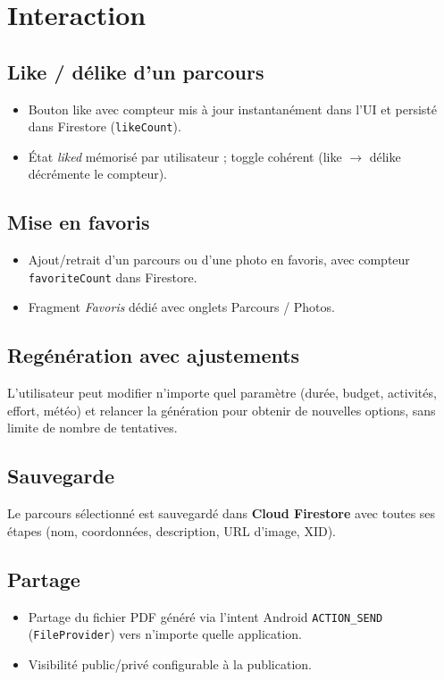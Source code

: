\documentclass[a4paper,11pt]{article}
\begin{document}
\section{Interaction}

\subsection{Like / délike d'un parcours}
\begin{itemize}[leftmargin=1.5em]
  \item Bouton like avec compteur mis à jour instantanément dans l'UI
        et persisté dans Firestore (\texttt{likeCount}).
  \item État \textit{liked} mémorisé par utilisateur ; toggle cohérent
        (like $\to$ délike décrémente le compteur).
\end{itemize}

\subsection{Mise en favoris}
\begin{itemize}[leftmargin=1.5em]
  \item Ajout/retrait d'un parcours ou d'une photo en favoris,
        avec compteur \texttt{favoriteCount} dans Firestore.
  \item Fragment \textit{Favoris} dédié avec onglets Parcours / Photos.
\end{itemize}

\subsection{Regénération avec ajustements}
L'utilisateur peut modifier n'importe quel paramètre (durée, budget, activités,
effort, météo) et relancer la génération pour obtenir de nouvelles options,
sans limite de nombre de tentatives.

\subsection{Sauvegarde}
Le parcours sélectionné est sauvegardé dans \textbf{Cloud Firestore}
avec toutes ses étapes (nom, coordonnées, description, URL d'image, XID).

\subsection{Partage}
\begin{itemize}[leftmargin=1.5em]
  \item Partage du fichier PDF généré via l'intent Android \texttt{ACTION\_SEND}
        (\texttt{FileProvider}) vers n'importe quelle application.
  \item Visibilité public/privé configurable à la publication.
\end{itemize}
\end{document}
